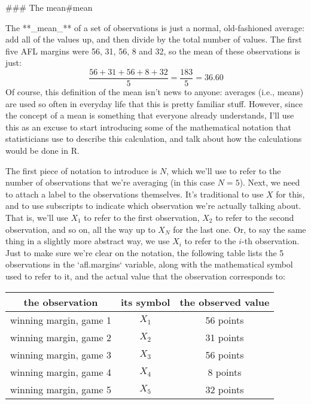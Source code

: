 ### The mean{#mean}

The **_mean_** of a set of observations is just a normal, old-fashioned average: add all of the values up, and then divide by the total number of values. The first five AFL margins were 56, 31, 56, 8 and 32, so the mean of these observations is just:
$$
\frac{56 + 31 + 56 + 8 + 32}{5} = \frac{183}{5} = 36.60
$$
Of course, this definition of the mean isn't news to anyone: averages (i.e., means) are used so often in everyday life that this is pretty familiar stuff. However, since the concept of a mean is something that everyone already understands, I'll use this as an excuse to start introducing some of the mathematical notation that statisticians use to describe this calculation, and talk about how the calculations would be done in R. 

The first piece of notation to introduce is $N$, which we'll use to refer to the number of observations that we're averaging (in this case $N = 5$). Next, we need to attach a label to the observations themselves. It's traditional to use $X$ for this, and to use subscripts to indicate which observation we're actually talking about. That is, we'll use $X_1$ to refer to the first observation, $X_2$ to refer to the second observation, and so on, all the way up to $X_N$ for the last one. Or, to say the same thing in a slightly more abstract way, we use $X_i$ to refer to the $i$-th observation. Just to make sure we're clear on the notation, the following table lists the 5 observations in the `afl.margins` variable, along with the mathematical symbol used to refer to it, and the actual value that the observation corresponds to:

\begin{center}
\begin{tabular}{ccc}
the observation & its symbol & the observed value \\ \hline
winning margin, game 1 & $X_1$ & 56 points \\
winning margin, game 2 & $X_2$ & 31 points \\
winning margin, game 3 & $X_3$ & 56 points \\
winning margin, game 4 & $X_4$ & 8 points \\
winning margin, game 5 & $X_5$ & 32 points \\
\end{tabular}
\end{center}



